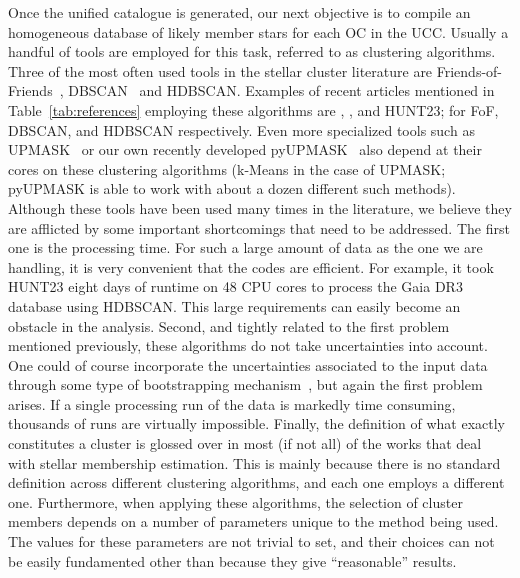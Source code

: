 \documentclass[fleqn,usenatbib]{mnras}
\begin{document}
Once the unified catalogue is generated, our next objective is to compile an
homogeneous database of likely member stars for each OC in the UCC.
Usually a handful of tools are employed for this task, referred to
as clustering algorithms. Three of the most often used tools in the stellar
cluster literature are Friends-of-Friends~\citep[][FoF]{Huchra_1982},
DBSCAN~\citep{Ester_1996} and HDBSCAN.
Examples of recent articles mentioned in Table~\ref{tab:references} employing
these algorithms are \cite{Liu_2019}, \cite{He_2023}, and HUNT23; for FoF,
DBSCAN, and HDBSCAN respectively.
Even more specialized tools such as UPMASK~\citep{Krone_2014} or our own
recently developed pyUPMASK~\citep[][a generalized Python-based
version of UPMASK]{Pera_2021} also depend at their cores on these clustering
algorithms (k-Means in the case of UPMASK; pyUPMASK is able to work with about
a dozen different such methods).\\

Although these tools have been used many times in the literature, we
believe they are afflicted by some important shortcomings that need to be
addressed. The first one is the processing time. For such a large amount of data
as the one we are handling, it is very convenient that the codes are efficient.
For example, it took HUNT23 eight days of runtime on 48 CPU cores to process the
Gaia DR3 database using HDBSCAN. This large requirements can easily become an
obstacle in the analysis.
%
Second, and tightly related to the first problem mentioned previously, these
algorithms do not take uncertainties into account. One could of course
incorporate the uncertainties associated to the input data through some type of
bootstrapping mechanism~\citep{Efron_1979}, but again the first problem arises.
If a single processing run of the data is markedly time consuming, thousands of
runs are virtually impossible.
%
Finally, the definition of what exactly constitutes a cluster is glossed over
in most (if not all) of the works that deal with stellar membership estimation.
This is mainly because there is no standard definition across different
clustering algorithms, and each one employs a different one. Furthermore, when
applying these algorithms, the selection of cluster members depends on a number
of parameters unique to the method being used. The values for these parameters
are not trivial to set, and their choices can not be easily fundamented other
than because they give ``reasonable'' results.
\end{document}
